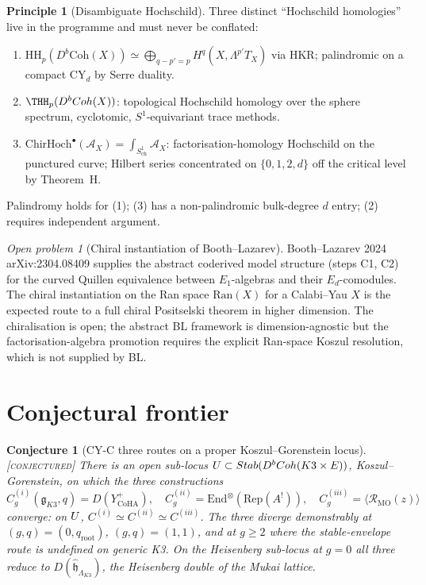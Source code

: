 \documentclass[11pt]{amsart}
\providecommand{\g}{\mathfrak{g}}
\providecommand{\fh}{\mathfrak{h}}
\providecommand{\cA}{\mathcal{A}}
\providecommand{\cR}{\mathcal{R}}
\providecommand{\CoHA}{\mathrm{CoHA}}
\providecommand{\ChirHoch}{\mathrm{ChirHoch}}
\providecommand{\HH}{\mathrm{HH}}
\providecommand{\Coh}{\mathrm{Coh}}
\providecommand{\Ran}{\mathrm{Ran}}
\providecommand{\Rep}{\mathrm{Rep}}
\providecommand{\End}{\mathrm{End}}
\providecommand{\Yp}{Y^{+}}
\providecommand{\MO}{\mathrm{MO}}
\providecommand{\Eone}{E_1}
\providecommand{\Ed}{E_d}
\providecommand{\ClaimStatusConjectured}{\textsc{[conjectured]}}
\theoremstyle{plain}
\newtheorem{conjecture}[theorem]{Conjecture}
\theoremstyle{definition}
\newtheorem{principle}[theorem]{Principle}
\theoremstyle{remark}
\newtheorem{openproblem}[theorem]{Open problem}
\begin{document}
\begin{principle}[Disambiguate Hochschild]
\label{prin:hochschild}
Three distinct ``Hochschild homologies'' live in the programme and
must never be conflated:
\begin{enumerate}
\item $\HH_p(D^b\Coh(X))\simeq\bigoplus_{q-p'=p}H^q(X,\Lambda^{p'}T_X)$
via HKR; palindromic on a compact CY$_d$ by Serre duality.
\item $\THH_p(D^b\Coh(X))$: topological Hochschild homology over the
sphere spectrum, cyclotomic, $S^1$-equivariant trace methods.
\item $\ChirHoch^\bullet(\cA_X)=\int_{S^1_{\mathrm{ch}}}\cA_X$:
factorisation-homology Hochschild on the punctured curve; Hilbert
series concentrated on $\{0,1,2,d\}$ off the critical level by
Theorem~H.
\end{enumerate}
Palindromy holds for (1); (3) has a non-palindromic bulk-degree $d$
entry; (2) requires independent argument.
\end{principle}

\begin{openproblem}[Chiral instantiation of Booth--Lazarev]
\label{open:BL}
Booth--Lazarev 2024 arXiv:2304.08409 supplies the abstract coderived
model structure (steps C1, C2) for the curved Quillen equivalence
between $\Eone$-algebras and their $\Ed$-comodules. The chiral
instantiation on the Ran space $\Ran(X)$ for a Calabi--Yau $X$ is the
expected route to a full chiral Positselski theorem in higher
dimension. The chiralisation is open; the abstract BL framework is
dimension-agnostic but the factorisation-algebra promotion requires
the explicit Ran-space Koszul resolution, which is not supplied by
BL.
\end{openproblem}

\section{Conjectural frontier}

\begin{conjecture}[CY-C three routes on a proper Koszul--Gorenstein locus]
\label{conj:cyc-three-routes}
\ClaimStatusConjectured{}\;
There is an open sub-locus $\cU\subset\mathrm{Stab}(D^b\Coh(K3\times E))$,
Koszul--Gorenstein, on which the three constructions
\[
C^{(i)}_g(\g_{K3},q)=D(\Yp_{\CoHA}),\quad
C^{(ii)}_g=\End^{\otimes}(\Rep(A^!)),\quad
C^{(iii)}_g=\langle\cR_{\MO}(z)\rangle
\]
converge: on $U$, $C^{(i)}\simeq C^{(ii)}\simeq C^{(iii)}$. The three
diverge demonstrably at $(g,q)=(0,q_{\mathrm{root}})$, $(g,q)=(1,1)$,
and at $g\geq 2$ where the stable-envelope route is undefined on
generic K3. On the Heisenberg sub-locus at $g=0$ all three reduce to
$D(\widehat{\fh}_{\Lambda_{K3}})$, the Heisenberg double of the Mukai
lattice.
\end{conjecture}
\end{document}
